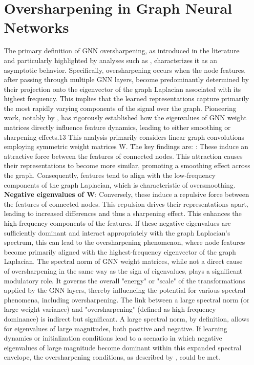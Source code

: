 \documentclass[11pt]{article}\usepackage{amsmath,amssymb,amsthm,bbm}
\newcommand{\1}{\mathbbm{1}}
\begin{document}
\section*{Oversharpening in Graph Neural Networks}
The primary definition of GNN oversharpening, as introduced in the literature and particularly highlighted by analyses such as \cite{GRAFF}, characterizes it as an asymptotic behavior. Specifically, oversharpening occurs when the node features, after passing through multiple GNN layers, become predominantly determined by their projection onto the eigenvector of the graph Laplacian associated with its highest frequency. This implies that the learned representations capture primarily the most rapidly varying components of the signal over the graph.
Pioneering work, notably by \citeauthor{GRAFF}, has rigorously established how the eigenvalues of GNN weight matrices directly influence feature dynamics, leading to either smoothing or sharpening effects.13 This analysis primarily considers linear graph convolutions employing symmetric weight matrices W.
The key findings are:
: These induce an attractive force between the features of connected nodes. This attraction causes their representations to become more similar, promoting a smoothing effect across the graph. Consequently, features tend to align with the low-frequency components of the graph Laplacian, which is characteristic of oversmoothing.
\textbf{Negative eigenvalues of W}: Conversely, these induce a repulsive force between the features of connected nodes. This repulsion drives their representations apart, leading to increased differences and thus a sharpening effect. This enhances the high-frequency components of the features. If these negative eigenvalues are sufficiently dominant and interact appropriately with the graph Laplacian's spectrum, this can lead to the oversharpening phenomenon, where node features become primarily aligned with the highest-frequency eigenvector of the graph Laplacian.
The spectral norm of GNN weight matrices, while not a direct cause of oversharpening in the same way as the sign of eigenvalues, plays a significant modulatory role. It governs the overall "energy" or "scale" of the transformations applied by the GNN layers, thereby influencing the potential for various spectral phenomena, including oversharpening.
The link between a large spectral norm (or large weight variance) and "oversharpening" (defined as high-frequency dominance) is indirect but significant. 
A large spectral norm, by definition, allows for eigenvalues of large magnitudes, both positive and negative.
If learning dynamics or initialization conditions lead to a scenario in which negative eigenvalues of large magnitude become dominant within this expanded spectral envelope, the oversharpening conditions, as described by 
\citet{GRAFF}, could be met.
\end{document}
